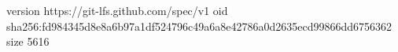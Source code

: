 version https://git-lfs.github.com/spec/v1
oid sha256:fd984345d8e8a6b97a1df524796c49a6a8e42786a0d2635ecd99866dd6756362
size 5616
